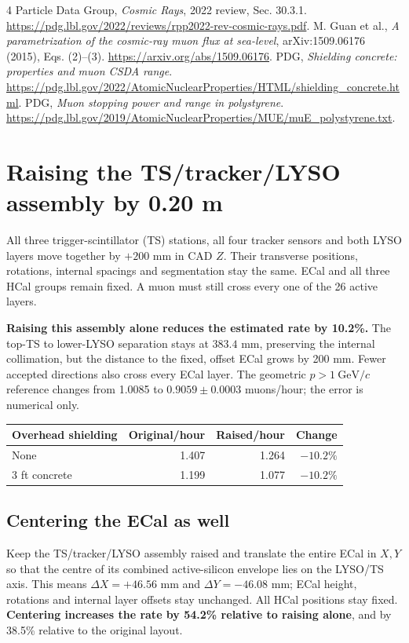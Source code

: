 \documentclass[10pt,letterpaper]{article}
\begin{document}
\begin{thebibliography}{4}\small\setlength{\itemsep}{0pt}
 Particle Data Group, \emph{Cosmic Rays}, 2022 review, Sec. 30.3.1.
\url{https://pdg.lbl.gov/2022/reviews/rpp2022-rev-cosmic-rays.pdf}.
 M. Guan et al., \emph{A parametrization of the cosmic-ray muon flux at sea-level}, arXiv:1509.06176 (2015), Eqs. (2)--(3). \url{https://arxiv.org/abs/1509.06176}.
 PDG, \emph{Shielding concrete: properties and muon CSDA range}.
\url{https://pdg.lbl.gov/2022/AtomicNuclearProperties/HTML/shielding_concrete.html}.
 PDG, \emph{Muon stopping power and range in polystyrene}.
\url{https://pdg.lbl.gov/2019/AtomicNuclearProperties/MUE/muE_polystyrene.txt}.
\end{thebibliography}
\clearpage
\section*{Raising the TS/tracker/LYSO assembly by 0.20 m}
All three trigger-scintillator (TS) stations, all four tracker sensors and both
LYSO layers move together by $+200$ mm in CAD $Z$. Their transverse positions,
rotations, internal spacings and segmentation stay the same. ECal and all three
HCal groups remain fixed. A muon must still cross every one of the 26 active layers.

\textbf{Raising this assembly alone reduces the estimated rate by 10.2\%.}
The top-TS to lower-LYSO separation stays at $383.4$ mm, preserving the internal
collimation, but the distance to the fixed, offset ECal grows by 200 mm. Fewer
accepted directions also cross every ECal layer. The geometric
$p>1\ \mathrm{GeV}/c$ reference changes from 1.0085 to
$0.9059\pm0.0003$ muons/hour; the error is numerical only.

\begin{center}
\begin{tabular}{lrrr}
\toprule
Overhead shielding & Original/hour & Raised/hour & Change\\
\midrule
None & 1.407 & 1.264 & $-10.2\%$\\
3 ft concrete & 1.199 & 1.077 & $-10.2\%$\\
\bottomrule
\end{tabular}
\end{center}

\subsection*{Centering the ECal as well}
Keep the TS/tracker/LYSO assembly raised and translate the entire ECal in $X,Y$
so that the centre of its combined active-silicon envelope lies on the LYSO/TS
axis. This means $\Delta X=+46.56$ mm and $\Delta Y=-46.08$ mm; ECal height,
rotations and internal layer offsets stay unchanged. All HCal positions stay fixed.
\textbf{Centering increases the rate by 54.2\% relative to raising alone},
and by 38.5\% relative to the original layout.
\end{document}
